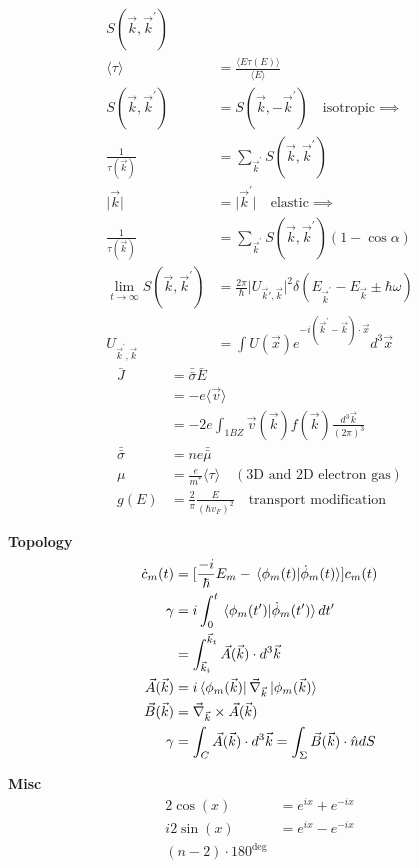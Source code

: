 \documentclass[12pt]{article}
\begin{document}
\begin{multicols}{2}
\begin{align}
  S(\vec{k}, \vec{k}^{\prime})\\
  \langle \tau \rangle &= \frac{\langle E \tau(E)\rangle}{\langle E \rangle}\\
  S(\vec{k}, \vec{k}^{\prime}) &= S(\vec{k}, -\vec{k}^{\prime}) \quad \textrm{isotropic} \implies\\
  \frac{1}{\tau(\vec{k})} &= \sum_{\vec{k}^{\prime}}S(\vec{k}, \vec{k}^{\prime})\\
  \lvert\vec{k}\rvert &= \lvert\vec{k}^{\prime}\rvert \quad \textrm{elastic} \implies\\
  \frac{1}{\tau(\vec{k})} &= \sum_{\vec{k}^{\prime}}S(\vec{k}, \vec{k}^{\prime})(1 - \cos\alpha)\\
  \lim_{t \rightarrow \infty} S(\vec{k}, \vec{k}^{\prime}) &= \frac{2\pi}{\hbar} \lvert U_{\vec{k}{\prime}, \vec{k}}\rvert^2 \delta(E_{\vec{k}^{\prime}} - E_{\vec{k}} \pm \hbar\omega)\\
  U_{\vec{k}^{\prime}, \vec{k}} &= \int U(\vec{x})e^{-i(\vec{k}^{\prime} - \vec{k}) \cdot \vec{x}}d^3\vec{x}
\end{align}
\begin{align}
  \bar{J} &= \bar{\bar{\sigma}} \bar{E}\\
  &= -e \langle \vec{v} \rangle\\
  &= -2 e \int_{1BZ} \vec{v}(\vec{k})f(\vec{k})\frac{d^3\vec{k}}{(2\pi)^3}\\
  \bar{\bar{\sigma}} &= ne\bar{\bar{\mu}}\\ %
  \mu &= \frac{e}{m^{*}} \langle \tau \rangle \quad (\textrm{3D and 2D electron gas})\\
  g(E) &= \frac{2}{\pi} \frac{E}{(\hbar v_F)^2} \quad \textrm{transport modification}
\end{align}

\noindent
\textbf{Topology}
\begin{align}
  \dot{c}_m(t) &= [\frac{-i}{\hbar}E_m - \bra*{\phi_m(t)}\ket*{\dot{\phi}_m(t)}] c_m(t)\\
  \gamma &= i \int_0^t \bra*{\phi_m(t^{\prime})}\ket*{\dot{\phi}_m(t^{\prime})} dt^{\prime}\\
  &= \int_{\vec{k}_i}^{\vec{k}_t} \vec{A}(\vec{k}) \cdot d^3\vec{k}\\
  \vec{A}(\vec{k}) &= i \bra*{\phi_m(\vec{k})}\vec{\nabla}_{\vec{k}}\ket*{\phi_m(\vec{k})}\\
  \vec{B}(\vec{k}) &= \vec{\nabla}_{\vec{k}} \times \vec{A}(\vec{k})\\
  \gamma &= \int_C \vec{A}(\vec{k}) \cdot d^3\vec{k} = \int_\Sigma \vec{B}(\vec{k}) \cdot \hat{n} dS
\end{align}

\noindent
\textbf{Misc}
\begin{align}
  2\cos(x) &= e^{ix} + e^{-ix}\\
  i2\sin(x) &= e^{ix} - e^{-ix}\\
  (n - 2) \cdot 180^{\deg}
\end{align}

\end{multicols}
\end{document}
